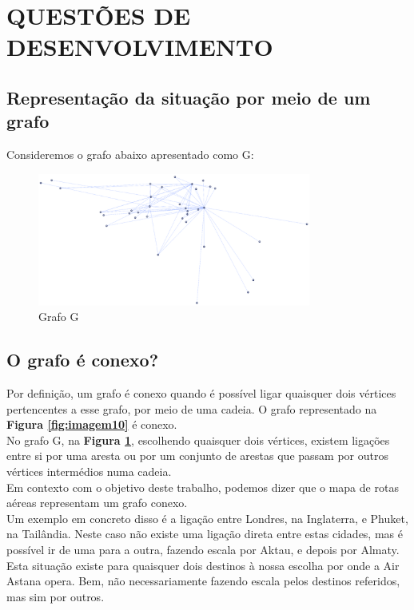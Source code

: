\clearpage
\section{QUESTÕES DE DESENVOLVIMENTO}
\label{section}
\subsection{Representação da situação por meio de um grafo}
Consideremos o grafo abaixo apresentado como G:\\
\begin{figure}[h]
    \centering
    \includegraphics[width=0.8\textwidth]{imgs/Figura11}
    \caption{Grafo G\label{fig:imagem11}}
\end{figure}
\subsection{ O grafo é conexo?}
\indent Por definição, um grafo é conexo quando é possível ligar quaisquer dois vértices pertencentes a esse grafo, por meio de uma cadeia.
O grafo representado na \textbf{Figura \ref*{fig:imagem10}} é conexo.\\
\indent No grafo G, na \textbf{Figura \ref*{fig:imagem11}}, escolhendo quaisquer dois vértices, existem ligações entre si por uma 
aresta ou por um conjunto de arestas que passam por outros vértices intermédios numa cadeia.\\
\indent Em contexto com o objetivo deste trabalho, podemos dizer que o mapa de rotas aéreas representam um 
grafo conexo.\\
\indent Um exemplo em concreto disso é a ligação entre Londres, na Inglaterra, e Phuket, na Tailândia. Neste 
caso não existe uma ligação direta entre estas cidades, mas é possível ir de uma para a outra, fazendo escala 
por Aktau, e depois por Almaty. Esta situação existe para quaisquer dois destinos à nossa escolha por onde a 
Air Astana opera. Bem, não necessariamente fazendo escala pelos destinos referidos, mas sim por outros.\\
